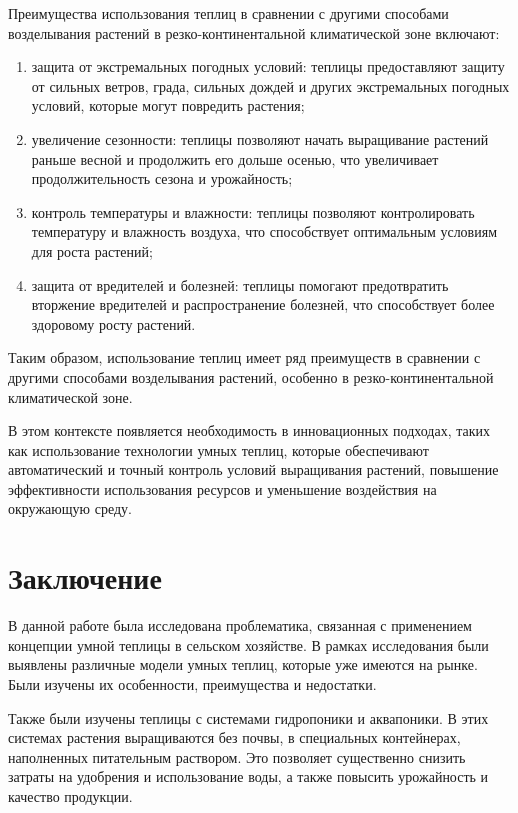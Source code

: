 \documentclass{altsu-bachelor}
\begin{document}
Преимущества использования теплиц в сравнении с другими способами возделывания растений в резко-континентальной климатической зоне включают:

\begin{enumerate}
    \item защита от экстремальных погодных условий: теплицы предоставляют защиту от сильных ветров, града, сильных дождей и других экстремальных погодных условий, которые могут повредить растения;
    \item увеличение сезонности: теплицы позволяют начать выращивание растений раньше весной и продолжить его дольше осенью, что увеличивает продолжительность сезона и урожайность;
    \item контроль температуры и влажности: теплицы позволяют контролировать температуру и влажность воздуха, что способствует оптимальным условиям для роста растений;
    \item защита от вредителей и болезней: теплицы помогают предотвратить вторжение вредителей и распространение болезней, что способствует более здоровому росту растений.
\end{enumerate}

Таким образом, использование теплиц имеет ряд преимуществ в сравнении с другими способами возделывания растений, особенно в резко-континентальной климатической зоне.

В этом контексте появляется необходимость в инновационных подходах, таких как использование технологии умных теплиц, которые обеспечивают автоматический и точный контроль условий выращивания растений, повышение эффективности использования ресурсов и уменьшение воздействия на окружающую среду.






\chapter*{Заключение}

В данной работе была исследована проблематика, связанная с применением концепции умной теплицы в сельском хозяйстве. В рамках исследования были выявлены различные модели умных теплиц, которые уже имеются на рынке. Были изучены их особенности, преимущества и недостатки.

Также были изучены теплицы с системами гидропоники и аквапоники. В этих системах растения выращиваются без почвы, в специальных контейнерах, наполненных питательным раствором. Это позволяет существенно снизить затраты на удобрения и использование воды, а также повысить урожайность и качество продукции.
\end{document}
